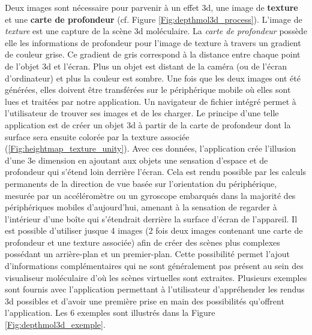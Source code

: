 Deux images sont nécessaire pour parvenir à un effet 3d, une image de \textbf{texture} et une \textbf{carte de profondeur} (cf. Figure \ref{Fig:depthmol3d_process}). L'image de \textit{texture} est une capture de la scène 3d moléculaire. La \textit{carte de profondeur} possède elle les informations de profondeur pour l'image de texture à travers un gradient de couleur grise. Ce gradient de gris correspond à la distance entre chaque point de l'objet 3d et l'écran. Plus un objet est distant de la caméra (ou de l'écran d'ordinateur) et plus la couleur est sombre. Une fois que les deux images ont été générées, elles doivent être transférées sur le périphérique mobile où elles sont lues et traitées par notre application. Un navigateur de fichier intégré permet à l'utilisateur de trouver ses images et de les charger. Le principe d'une telle application est de créer un objet 3d à partir de la carte de profondeur dont la surface sera ensuite colorée par la texture associée (\ref{Fig:heightmap_texture_unity}). Avec ces données, l'application crée l'illusion d'une 3e dimension en ajoutant aux objets une sensation d'espace et de profondeur qui s'étend loin derrière l'écran. Cela est rendu possible par les calculs permanents de la direction de vue basée sur l'orientation du périphérique, mesurée par un accéléromètre ou un gyroscope embarqués dans la majorité des périphériques mobiles d'aujourd'hui, amenant à la sensation de regarder à l'intérieur d'une boîte qui s'étendrait derrière la surface d'écran de l'appareil.
Il est possible d'utiliser jusque 4 images (2 fois deux images contenant une carte de profondeur et une texture associée) afin de créer des scènes plus complexes possédant un arrière-plan et un premier-plan. Cette possibilité permet l'ajout d'informations complémentaires qui ne sont généralement pas présent au sein des visualiseur moléculaire d'où les scènes virtuelles sont extraites.
Plusieurs exemples sont fournis avec l'application permettant à l'utilisateur d'appréhender les rendus 3d possibles et d'avoir une première prise en main des possibilités qu'offrent l'application. Les 6 exemples sont illustrés dans la Figure \ref{Fig:depthmol3d_exemple}.

